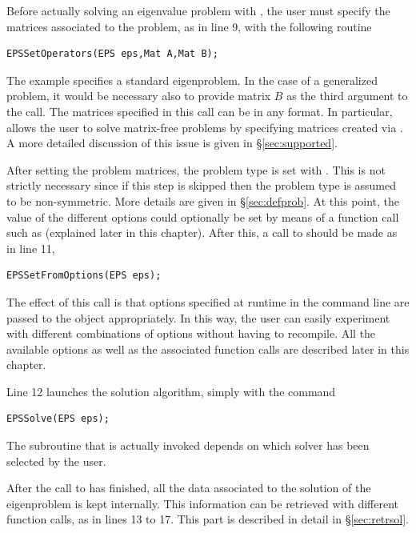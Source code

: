 	Before actually solving an eigenvalue problem with , the user must specify the matrices associated to the problem, as in line 9, with the following routine
	\begin{Verbatim}[fontsize=\small]
	EPSSetOperators(EPS eps,Mat A,Mat B);
	\end{Verbatim}
	The example specifies a standard eigenproblem. In the case of a generalized problem, it would be necessary also to provide matrix $B$ as the third argument to the call. The matrices specified in this call can be in any \petsc format. In particular,  allows the user to solve matrix-free problems by specifying matrices created via . A more detailed discussion of this issue is given in \S\ref{sec:supported}.

	After setting the problem matrices, the problem type is set with . This is not strictly necessary since if this step is skipped then the problem type is assumed to be non-symmetric. More details are given in \S\ref{sec:defprob}.
	At this point, the value of the different options could optionally be set by means of a function call such as  (explained later in this chapter). After this, a call to  should be made as in line 11, 
	\begin{Verbatim}[fontsize=\small]
	EPSSetFromOptions(EPS eps);
	\end{Verbatim}
	The effect of this call is that options specified at runtime in the command line are passed to the  object appropriately. In this way, the user can easily experiment with different combinations of options without having to recompile. All the available options as well as the associated function calls are described later in this chapter.

	Line 12 launches the solution algorithm, simply with the command
	\begin{Verbatim}[fontsize=\small]
	EPSSolve(EPS eps);
	\end{Verbatim}
	The subroutine that is actually invoked depends on which solver has been selected by the user. 
        
        After the call to  has finished, all the data associated to the solution of the eigenproblem is kept internally. This information can be retrieved with different function calls, as in lines 13 to 17. This part is described in detail in \S\ref{sec:retrsol}.

